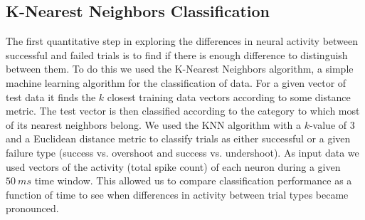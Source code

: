 \documentclass[11pt,a4paper]{article}
\begin{document}
\subsection{K-Nearest Neighbors Classification}

The first quantitative step in exploring the differences in neural activity between successful and failed trials is to find if there is enough difference to distinguish between them. To do this we used the K-Nearest Neighbors algorithm, a simple machine learning algorithm for the classification of data. For a given vector of test data it finds the $k$ closest training data vectors according to some distance metric. The test vector is then classified according to the category to which most of its nearest neighbors belong. We used the KNN algorithm with a $k$-value of 3 and a Euclidean distance metric to classify trials as either successful or a given failure type (success vs. overshoot and success vs. undershoot). As input data we used vectors of the activity (total spike count) of each neuron during a given $50~ms$ time window. This allowed us to compare classification performance as a function of time to see when differences in activity between trial types became pronounced. 
\end{document}
